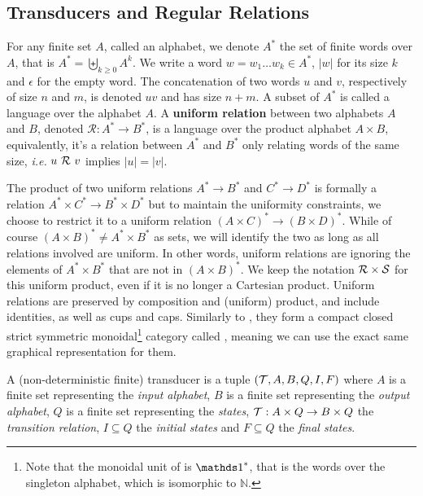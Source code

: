 
\subsection{Transducers and Regular Relations}

For any finite set $A$, called an alphabet, we denote $A^*$ the set of finite words over $A$, that is $A^* = \biguplus_{k \geq 0} A^k$. %
We write a word $w = w_1\dots w_k \in A^*$, $|w|$ for its size $k$ and $\epsilon$ for the empty word. 
The concatenation of two words $u$ and $v$, respectively of size $n$ and $m$, is denoted $uv$ and has size $n+m$. 
A subset of $A^*$ is called a language over the alphabet $A$. A \textbf{uniform relation} between two alphabets $A$ and $B$, denoted $\mathcal{R}:A^*\to B^*$, is a language over the product alphabet $A\times B$, equivalently, it's a relation between $A^* $ and $B^* $ only relating words of the same size, \textit{i.e.} $u~{\mathcal{R}}~v $ implies $|u|=|v|$.

The product of two uniform relations $A^* \to B^* $ and $C^* \to D^* $ is formally a relation $A^* \times C^* \to B^* \times D^* $ but to maintain the uniformity constraints, we choose to restrict it to a uniform relation $(A\times C)^* \to (B\times D)^* $. 
While of course $(A\times B)^* \neq A^* \times B^*$ as sets, we will identify the two as long as all relations involved are uniform. In other words, uniform relations are ignoring the elements of $A^* \times B^* $ that are not in $(A\times B)^*$. We keep the notation ${\mathcal{R}} \times {\mathcal{S}}$ for this uniform product, even if it is no longer a Cartesian product. Uniform relations are preserved by composition and (uniform) product, and include identities, as well as cups and caps. Similarly to , they form a compact closed strict symmetric monoidal\footnote{Note that the monoidal unit of  is $\one^*$, that is the words over the singleton alphabet, which is isomorphic to $\mathbb{N}$.} category called , meaning we can use the exact same graphical representation for them. 

\begin{definition}[Transducer]
	A (non-deterministic finite) transducer is a tuple $({\mathcal{T}}, A, B, Q, I, F)$ where $A$ is a finite set representing the \emph{input alphabet}, $B$ is a finite set representing the \emph{output alphabet}, $Q$ is a finite set representing the \emph{states}, ${\mathcal{T}}: A\times Q \to B\times Q$ the \emph{transition relation}, ${I} \subseteq Q$ the \emph{initial states} and ${F} \subseteq Q$ the \emph{final states}.
\end{definition}

